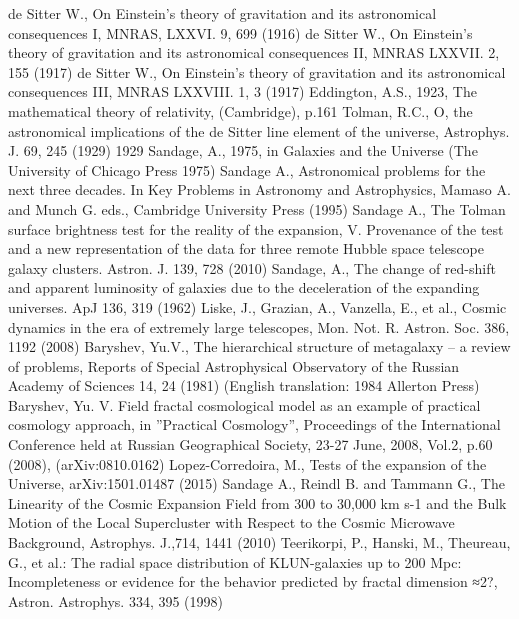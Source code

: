 \begin{thebibliography}{}
 de Sitter W.,  On Einstein's theory of gravitation and its astronomical consequences I, MNRAS, LXXVI. 9, 699 (1916)
 de Sitter W., On Einstein's theory of gravitation and its astronomical consequences  II, MNRAS LXXVII. 2, 155 (1917)
de Sitter W., On Einstein's theory of gravitation  and its astronomical consequences III, MNRAS LXXVIII. 1, 3 (1917)
 Eddington, A.S., 1923, The mathematical theory of relativity, (Cambridge), p.161
Tolman, R.C., O, the astronomical implications of the de Sitter line element of the universe, Astrophys. J. 69, 245 (1929) 1929
Sandage, A., 1975, in Galaxies and the Universe (The University of Chicago Press 1975)
Sandage A.,  Astronomical problems for the next three decades. In Key Problems in Astronomy and Astrophysics, Mamaso A. and Munch G. eds., Cambridge University Press (1995)
Sandage A., The Tolman surface brightness test for the reality of the expansion, V. Provenance of the test and a new representation of the data for three remote Hubble space telescope galaxy clusters. Astron. J. 139, 728 (2010)
 Sandage, A., The change of red-shift and apparent luminosity of galaxies due to the deceleration of the expanding universes. ApJ 136, 319 (1962)
 Liske, J., Grazian, A., Vanzella, E., et al., Cosmic dynamics in the era of extremely large telescopes, Mon. Not. R. Astron. Soc. 386, 1192 (2008)
Baryshev, Yu.V., The hierarchical structure of metagalaxy – a review of problems, Reports of Special Astrophysical Observatory of the Russian Academy of Sciences 14, 24 (1981) (English translation: 1984 Allerton Press)
 Baryshev, Yu. V. Field fractal cosmological model as an example of practical  cosmology approach, in ”Practical Cosmology”, Proceedings of the International Conference held at Russian Geographical Society, 23-27 June, 2008, Vol.2, p.60 (2008), (arXiv:0810.0162)
Lopez-Corredoira, M., Tests of the expansion of the Universe, arXiv:1501.01487 (2015)
 Sandage A., Reindl B. and Tammann G., The Linearity of the Cosmic Expansion  Field from 300 to 30,000 km s-1 and the Bulk Motion of the Local Supercluster with Respect to the Cosmic Microwave Background, Astrophys. J.,714, 1441 (2010)
Teerikorpi, P., Hanski, M., Theureau, G., et al.: The radial space distribution of KLUN-galaxies up to 200 Mpc: Incompleteness or evidence for the behavior predicted by fractal dimension ≈2?, Astron. Astrophys. 334, 395 (1998)

\end{thebibliography}
